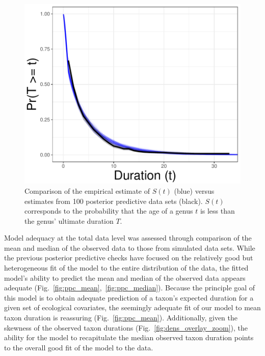 \documentclass[11pt]{article}
\begin{document}
\begin{figure}[ht]
  \centering
  \includegraphics[height = 0.5\textheight,width=\textwidth,keepaspectratio=true]{figure/survival_curves_cweib_cens}
  \caption{Comparison of the empirical estimate of \(S(t)\) (blue) versus estimates from 100 posterior predictive data sets (black). \(S(t)\) corresponds to the probability that the age of a genus \(t\) is less than the genus' ultimate duration \(T\). }
  \label{fig:surv}
\end{figure}


Model adequacy at the total data level was assessed through comparison of the mean and median of the observed data to those from simulated data sets. While the previous posterior predictive checks have focused on the relatively good but heterogeneous fit of the model to the entire distribution of the data, the fitted model's ability to predict the mean and median of the observed data appears adequate (Fig.~\ref{fig:ppc_mean},~\ref{fig:ppc_median}). Because the principle goal of this model is to obtain adequate prediction of a taxon's expected duration for a given set of ecological covariates, the seemingly adequate fit of our model to mean taxon duration is reassuring (Fig.~\ref{fig:ppc_mean}). Additionally, given the skewness of the observed taxon durations (Fig.~\ref{fig:dens_overlay_zoom}), the ability for the model to recapitulate the median observed taxon duration points to the overall good fit of the model to the data.
\end{document}
